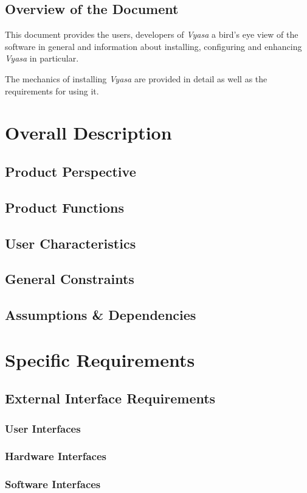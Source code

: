 \documentclass[12pt,a4paper]{article}
\newcommand{\VS}{\textit{Vyasa}}
\begin{document}
\subsection{Overview of the Document}
This document provides the users, developers of \VS{} a bird's eye view
of the software in general and information about installing, configuring
and enhancing \VS{} in particular.

The mechanics of installing \VS{} are provided in detail as well as the
requirements for using it.


\section{Overall Description}
\subsection{Product Perspective}
\subsection{Product Functions}
\subsection{User Characteristics}
\subsection{General Constraints}
\subsection{Assumptions \&{} Dependencies}

\section{Specific Requirements}
\subsection{External Interface Requirements}
\subsubsection{User Interfaces}
\subsubsection{Hardware Interfaces}
\subsubsection{Software Interfaces}
\end{document}
